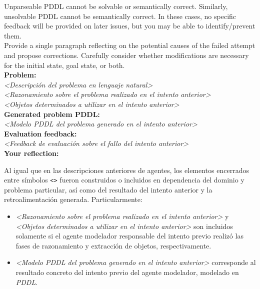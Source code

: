 \begin{anexes}
\begin{tcolorbox}[colback=gray!10!white, colframe=black, title=\textit{Prompt} del agente de reflexión, fonttitle=\bfseries, breakable]
Unparseable PDDL cannot be solvable or semantically correct. Similarly, unsolvable PDDL cannot be semantically correct. In these cases, no specific feedback will be provided on later issues, but you may be able to identify/prevent them.\\

Provide a single paragraph reflecting on the potential causes of the failed attempt and propose corrections. Carefully consider whether modifications are necessary for the initial state, goal state, or both.\\

\textbf{Problem:} \\
\textit{<Descripción del problema en lenguaje natural>}\\

\textit{<Razonamiento sobre el problema realizado en el intento anterior>}\\

\textit{<Objetos determinados a utilizar en el intento anterior>}\\

\textbf{Generated problem PDDL:} \\
\textit{<Modelo PDDL del problema generado en el intento anterior>}\\

\textbf{Evaluation feedback:} \\
\textit{<Feedback de evaluación sobre el fallo del intento anterior>}\\

\textbf{Your reflection:}
\end{tcolorbox}

Al igual que en las descripciones anteriores de agentes, los elementos encerrados entre símbolos \texttt{<}\texttt{>} fueron construidos o incluidos en dependencia del dominio y problema particular, así como del resultado del intento anterior y la retroalimentación generada. Particularmente:

\begin{itemize}
    \item \textit{<Razonamiento sobre el problema realizado en el intento anterior>} y \textit{<Objetos determinados a utilizar en el intento anterior>} son incluidos solamente si el agente modelador responsable del intento previo realizó las fases de razonamiento y extracción de objetos, respectivamente.
    
    \item \textit{<Modelo PDDL del problema generado en el intento anterior>} corresponde al resultado concreto del intento previo del agente modelador, modelado en \textit{PDDL}.
    

\end{itemize}
\end{anexes}
